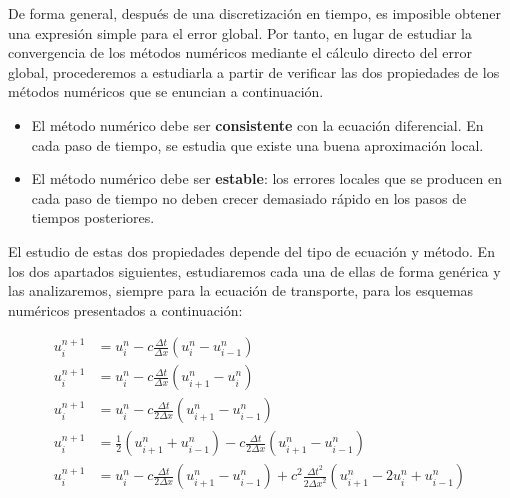 De forma general, después de una discretización en tiempo, es
imposible obtener una expresión simple para el error global.
Por tanto, en lugar de estudiar la convergencia de los métodos
numéricos mediante el cálculo directo del error global, procederemos
a estudiarla a partir de verificar las dos propiedades de los métodos
numéricos que se enuncian a continuación.

\begin{itemize}
  \item

        El método numérico debe ser \textbf{consistente} con la
        ecuación diferencial.
        En cada paso de tiempo, se estudia que existe una buena
        aproximación local.

  \item

        El método numérico debe ser \textbf{estable}: los errores
        locales que se producen en cada paso de tiempo no deben
        crecer demasiado rápido en los pasos de tiempos posteriores.
\end{itemize}


El estudio de estas dos propiedades depende del tipo de ecuación y
método.
En los dos apartados siguientes, estudiaremos cada una de ellas de
forma genérica y las analizaremos, siempre para la ecuación de
transporte, para los esquemas numéricos presentados a continuación:

\begin{align}
  u^{n+1}_{i} & =
  u^{n}_{i}-
  c\frac{\Delta t}{\Delta x}
  \left(
  u^{n}_{i}-
  u^{n}_{i-1}
  \right)\label{eq:upwindscheme}        \\
  u^{n+1}_{i} & =
  u^{n}_{i}-
  c\frac{\Delta t}{\Delta x}
  \left(
  u^{n}_{i+1}-
  u^{n}_{i}
  \right)\label{eq:downwindscheme}      \\
  u^{n+1}_{i} & =
  u^{n}_{i}-
  c\frac{\Delta t}{2\Delta x}
  \left(
  u^{n}_{i+1}-u^{n}_{i-1}
  \right)\label{eq:ftcsscheme}          \\
  u^{n+1}_{i} & =
  \frac{1}{2}
  \left(
  u^{n}_{i+1}+
  u^{n}_{i-1}
  \right)-
  c\frac{\Delta t}{2\Delta x}
  \left(
  u^{n}_{i+1}-
  u^{n}_{i-1}
  \right)\label{eq:laxfriedrichsscheme} \\
  u^{n+1}_{i} & =
  u^{n}_{i}-
  c\frac{\Delta t}{2\Delta x}
  \left(
  u^{n}_{i+1}-
  u^{n}_{i-1}
  \right)+
  c^{2}
  \frac{{\Delta t}^{2}}{2{\Delta x}^{2}}
  \left(
  u^{n}_{i+1}-
  2u^{n}_{i}+
  u^{n}_{i-1}
  \right)\label{eq:laxwendroffscheme}
\end{align}

